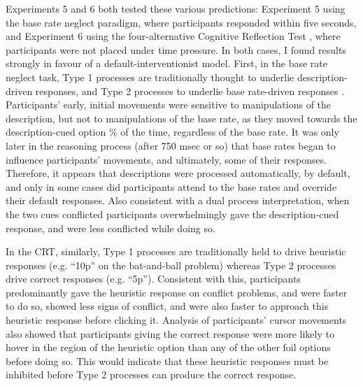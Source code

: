 Experiments 5 and 6 both tested these various predictions:
Experiment 5 using the base rate neglect paradigm,
where participants responded within five seconds,
and Experiment 6 using the four-alternative Cognitive Reflection Test \citep[CRT;][]{Frederick2005},
where participants were not placed under time pressure.
In both cases, I found results strongly in favour of a default-interventionist model.
First, in the base rate neglect task,
Type 1 processes are traditionally thought to underlie description-driven responses,
and Type 2 processes to underlie base rate-driven responses
\citep{Barbey2007,Kahneman2005,Kahneman2002}.
Participants' early, initial movements were sensitive
to manipulations of the description,
but not to manipulations of the base rate,
as they moved towards the description-cued option
\% of the time, regardless of the base rate.
It was only later in the reasoning process (after 750 msec or so)
that base rates began to influence participants' movements,
and ultimately, some of their responses.
Therefore, it appears that descriptions were processed automatically, by default,
and only in some cases did participants
attend to the base rates and override their default responses.
Also consistent with a dual process interpretation,
when the two cues conflicted participants
overwhelmingly gave the description-cued response,
and were less conflicted while doing so.

In the CRT, similarly,
Type 1 processes are traditionally held \citep{Frederick2005,Kahneman2005}
to drive heuristic responses
(e.g. ``10p'' on the bat-and-ball problem)
whereas Type 2 processes drive correct responses (e.g. ``5p'').
Consistent with this, participants predominantly gave
the heuristic response on conflict problems,
and were faster to do so, showed less signs of conflict,
and were also faster to approach this heuristic response before clicking it.
Analysis of participants' cursor movements also showed that
participants giving the correct response
were more likely to hover in the region of the heuristic option
than any of the other foil options before doing so.
This would indicate that these heuristic responses
must be inhibited before Type 2 processes can produce the correct response.

